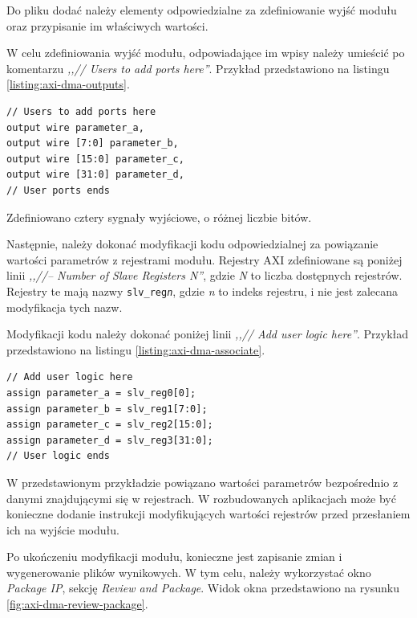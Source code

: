 Do pliku dodać należy elementy odpowiedzialne za zdefiniowanie wyjść modułu oraz przypisanie im właściwych wartości.

W celu zdefiniowania wyjść modułu, odpowiadające im wpisy należy umieścić po komentarzu \emph{,,// Users to add ports here''}. Przykład przedstawiono na listingu \ref{listing:axi-dma-outputs}.

\begin{lstlisting}[breaklines, label=listing:axi-dma-outputs, caption=Definicja interfejsów wyjściowych modułu.]
// Users to add ports here
output wire parameter_a,
output wire [7:0] parameter_b,
output wire [15:0] parameter_c,
output wire [31:0] parameter_d,
// User ports ends
\end{lstlisting}

Zdefiniowano cztery sygnały wyjściowe, o różnej liczbie bitów.

Następnie, należy dokonać modyfikacji kodu odpowiedzialnej za powiązanie wartości parametrów z rejestrami modułu. Rejestry AXI zdefiniowane są poniżej linii \emph{,,//-- Number of Slave Registers N''}, gdzie \emph{N} to liczba dostępnych rejestrów. Rejestry te mają nazwy \texttt{slv\_reg\emph{n}}, gdzie \emph{n} to indeks rejestru, i nie jest zalecana modyfikacja tych nazw.

Modyfikacji kodu należy dokonać poniżej linii \emph{,,// Add user logic here''}. Przykład przedstawiono na listingu \ref{listing:axi-dma-associate}.

\begin{lstlisting}[breaklines, label=listing:axi-dma-associate, caption=Powiązanie wyjść z rejestrami modułu.]
// Add user logic here
assign parameter_a = slv_reg0[0];
assign parameter_b = slv_reg1[7:0];
assign parameter_c = slv_reg2[15:0];
assign parameter_d = slv_reg3[31:0];
// User logic ends
\end{lstlisting}

W przedstawionym przykładzie powiązano wartości parametrów bezpośrednio z danymi znajdującymi się w rejestrach. W rozbudowanych aplikacjach może być konieczne dodanie instrukcji modyfikujących wartości rejestrów przed przesłaniem ich na wyjście modułu.

Po ukończeniu modyfikacji modułu, konieczne jest zapisanie zmian i wygenerowanie plików wynikowych. W tym celu, należy wykorzystać okno \emph{Package IP}, sekcję \emph{Review and Package}. Widok okna przedstawiono na rysunku \ref{fig:axi-dma-review-package}.

